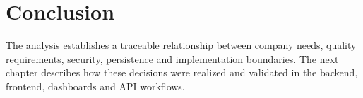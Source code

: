 
\section*{Conclusion}
The analysis establishes a traceable relationship between company needs,
quality requirements, security, persistence and implementation boundaries.
The next chapter describes how these decisions were realized and validated in
the backend, frontend, dashboards and API workflows.
